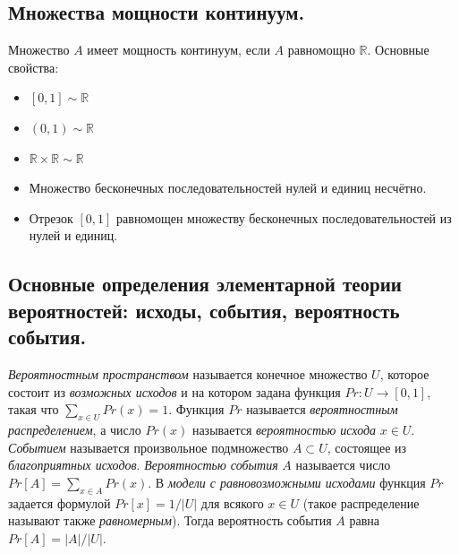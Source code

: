 \subsection{Множества мощности континуум.}
Множество $A$ имеет мощность континуум, если $A$ равномощно $\mathbb{R}$.
\newline
Основные свойства:
\begin{itemize}
    \item  $[0,1] \sim \mathbb{R}$
    \item  $(0,1) \sim \mathbb{R}$
    \item  $\mathbb{R} \times \mathbb{R} \sim \mathbb{R}$
    \item Множество бесконечных последовательностей нулей и единиц несчётно.
    \item Отрезок $[0, 1]$ равномощен множеству бесконечных последовательностей из нулей и единиц.
\end{itemize}

\subsection{Основные определения элементарной теории вероятностей: исходы, события, вероятность события.}
\textit{Вероятностным пространством} называется конечное множество $U$, которое состоит из \textit{возможных исходов} и на котором задана функция $Pr : U \to [0, 1]$, такая что $\sum_{ x \in U} Pr(x) = 1$.
\newline
\newline
Функция $Pr$ называется \textit{вероятностным распределением}, а число $Pr(x)$ называется \textit{вероятностью исхода} $x \in U$.
\newline
\newline
\textit{Событием} называется произвольное подмножество $A \subset U$, состоящее из \textit{благоприятных исходов}.
\newline
\newline
\textit{Вероятностью события} $A$ называется число $Pr[A] = \sum_{x \in A} Pr(x)$.
\newline
\newline
В \textit{модели с равновозможными исходами} функция $Pr$ задается формулой $Pr[x] = 1/|U|$ для всякого $x \in U$ (такое распределение называют также \textit{равномерным}). Тогда вероятность события $A$ равна $Pr[A] = |A|/|U|$.



